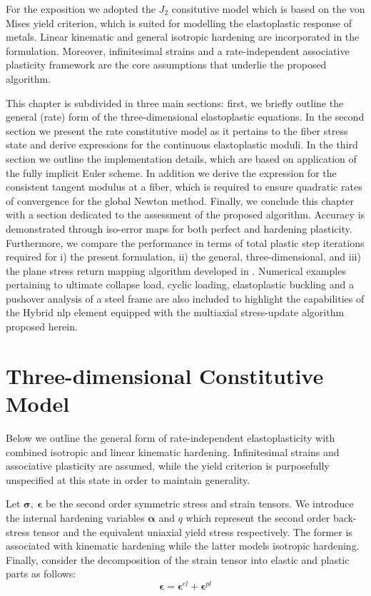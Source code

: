 For the exposition we adopted the $J_2$ consitutive model which is based on the 
von Mises yield criterion, which is suited for modelling the elastoplastic 
response of metals. Linear kinematic and general isotropic hardening are 
incorporated in the formulation. Moreover, infinitesimal strains and a 
rate-independent associative plasticity framework are the core assumptions that 
underlie the proposed algorithm. 

This chapter is subdivided in three main 
sections: first, we briefly outline the general (rate) form of the 
three-dimensional elastoplastic equations. In the second section we present the 
rate constitutive model as it pertains to the fiber stress state and derive 
expressions for the continuous elastoplastic moduli. In the third 
section we outline the implementation details, which are based on application 
of the fully implicit Euler scheme. In addition we derive the expression for 
the consistent tangent modulus at a fiber, which is required to ensure 
quadratic rates of convergence for the global Newton method. Finally, we 
conclude this chapter with a section dedicated to the assessment of the 
proposed algorithm. Accuracy is demonstrated through iso-error maps for both 
perfect and hardening plasticity. Furthermore, we compare the performance in 
terms of total plastic step iterations required for i) the present formulation, 
ii) the general, three-dimensional, and iii) the plane stress return mapping 
algorithm developed in \cite{Simo1986}. Numerical examples pertaining to 
ultimate collapse load, cyclic loading, elastoplastic buckling and a pushover 
analysis of a steel frame are also included to highlight the capabilities of 
the Hybrid \acrshort{nlp} element equipped with the multiaxial stress-update 
algorithm proposed herein.


\section{Three-dimensional Constitutive Model}\label{section:CH3-S2}
Below we outline the general form of rate-independent elastoplasticity 
with combined isotropic and linear kinematic hardening. Infinitesimal strains 
and associative plasticity are assumed, while the yield criterion is 
purposefully unspecified at this state in order to maintain generality. 

Let $\bm{\sigma},\ \bm{\epsilon}$ be the second order symmetric stress and 
strain tensors. We introduce the internal hardening variables $\bm{\alpha}$ and 
$q$ which represent the second order back-stress tensor and the equivalent 
uniaxial yield stress respectively. The former is associated with kinematic 
hardening while the latter models isotropic hardening. Finally, consider the 
decomposition of the strain tensor into elastic and plastic parts as follows:
\begin{equation}
	\bm{\epsilon} = \bm{\epsilon}^{el} + \bm{\epsilon}^{pl}
	\label{eq:DECOMP_STRAIN}
\end{equation} 

